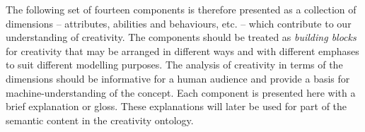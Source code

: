 \documentclass[10pt,letterpaper]{article}
\begin{document}
The following set of fourteen components is therefore presented as a collection of dimensions -- attributes, abilities and behaviours, etc. -- which contribute to our understanding of creativity. The components should be treated as {\em building blocks} for creativity that may be arranged in different ways and with different emphases to suit different modelling purposes. The analysis of creativity in terms of the dimensions should be informative for a human audience and provide a basis for machine-understanding of the concept. %
 Each component is presented here with a brief explanation or gloss. These explanations will later be used for part of the semantic content in the creativity ontology.

\end{document}
